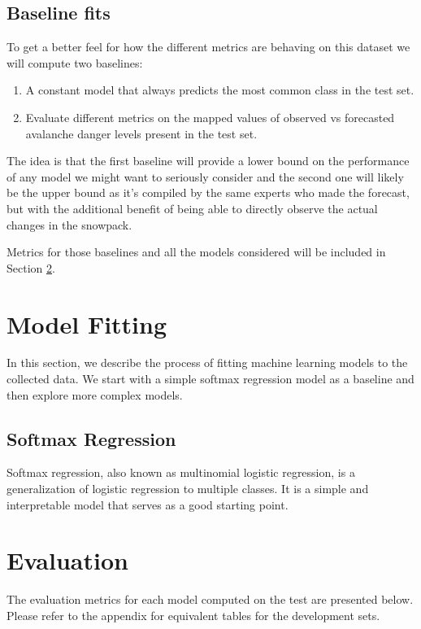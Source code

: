 \documentclass{article}
\begin{document}
\subsection{Baseline fits}

	To get a better feel for how the different metrics are behaving on this dataset we will compute two baselines: 
	\begin{enumerate}
		\item A constant model that always predicts the most common class in the test set.
		\item Evaluate different metrics on the mapped values of observed vs forecasted avalanche danger levels present in the test set.
	\end{enumerate}
	The idea is that the first baseline will provide a lower bound on the performance of any model we might want to seriously consider and the second one will likely be the upper bound as it's compiled by the same experts who made the forecast, but with the additional benefit of being able to directly observe the actual changes in the snowpack.

	Metrics for those baselines and all the models considered will be included in Section \ref{sec:evaluation}.

\section{Model Fitting}

	In this section, we describe the process of fitting machine learning models to the collected data. We start with a simple softmax regression model as a baseline and then explore more complex models.

\subsection{Softmax Regression}

	Softmax regression, also known as multinomial logistic regression, is a generalization of logistic regression to multiple classes. It is a simple and interpretable model that serves as a good starting point.

\section{Evaluation}\label{sec:evaluation}
	The evaluation metrics for each model computed on the test are presented below. Please refer to the appendix for equivalent tables for the development sets.
	
\end{document}
